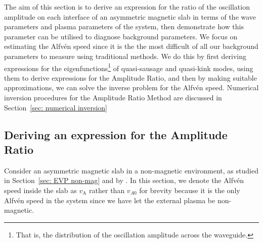 \documentclass[12pt]{../style-files/ociamthesis}
\begin{document}
The aim of this section is to derive an expression for the ratio of the oscillation amplitude on each interface of an asymmetric magnetic slab in terms of the wave parameters and plasma parameters of the system, then demonstrate how this parameter can be utilised to diagnose background parameters. We focus on estimating the Alfv\'{e}n speed since it is the the most difficult of all our background parameters to measure using traditional methods. We do this by first deriving expressions for the eigenfunctions\footnote{That is, the distribution of the oscillation amplitude across the waveguide.} of quasi-sausage and quasi-kink modes, using them to derive expressions for the Amplitude Ratio, and then by making suitable approximations, we can solve the inverse problem for the Alfv\'{e}n speed. Numerical inversion procedures for the Amplitude Ratio Method are discussed in Section~\ref{sec: numerical inversion} 

\subsection{Deriving an expression for the Amplitude Ratio} \label{sec: AR derivation}

Consider an asymmetric magnetic slab in a non-magnetic environment, as studied in Section~\ref{sec: EVP non-mag} and by \cite{all_etal17}. In this section, we denote the Alfv\'{e}n speed inside the slab as $v_\textrm{A}$ rather than $v_{A0}$ for brevity because it is the only Alfv\'{e}n speed in the system since we have let the external plasma be non-magnetic.
\end{document}
